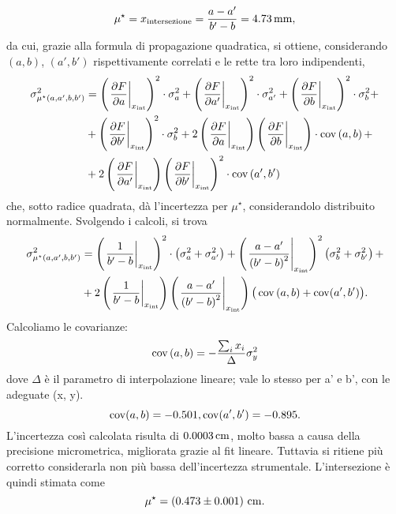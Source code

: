 \[ \mu ^{\star} = x_{\mathrm{intersezione}} = \frac{a - a'}{b' - b}  = 4.73 \,\mathrm{mm} , \]
da cui, grazie alla formula di propagazione quadratica, si ottiene, considerando $\left(a, b\right)$, $\left(a', b'\right)$ rispettivamente correlati e le rette tra loro indipendenti,
\begin{equation*}
\begin{split} %
	\sigma^2_{\mu ^{\star}\left(a, a', b, b'\right)}  &= \left(\left.\frac{\partial F}{\partial a}\right|_{x_{\mathrm{int}}}\right)^2 \cdot \sigma^2_{a} + \left(\left.\frac{\partial F}{\partial a'}\right|_{x_{\mathrm{int}}}\right)^2 \cdot \sigma^2_{a'} + \left(\left.\frac{\partial F}{\partial b}\right|_{x_{\mathrm{int}}}\right)^2 \cdot \sigma^2_{b} +\\
								&+ \left(\left.\frac{\partial F}{\partial b'}\right|_{x_{\mathrm{int}}}\right)^2 \cdot \sigma^2_{b} + 2\left(\left.\frac{\partial F}{\partial a}\right|_{x_{\mathrm{int}}}\right)\left(\left.\frac{\partial F}{\partial b}\right|_{x_{\mathrm{int}}}\right) \cdot \cov\left(a, b\right) + \\
								&+ 2\left(\left.\frac{\partial F}{\partial a'}\right|_{x_{\mathrm{int}}}\right)\left(\left.\frac{\partial F}{\partial b'}\right|_{x_{\mathrm{int}}}\right)^2 \cdot \cov \left(a', b'\right)
\end{split}
\end{equation*}
che, sotto radice quadrata, d\`a l'incertezza per $ \mu ^{\star} $, considerandolo distribuito normalmente.
Svolgendo i calcoli, si trova
\begin{equation}
\begin{split}
\sigma^2_{\mu ^{\star}\left(a, a', b, b'\right)}  &= \left(\left.\frac{1}{b'- b}\right|_{x_{\mathrm{int}}}\right)^2 \cdot \left(\sigma^2_{a} + \sigma^2_{a'}\right) + \left(\left.\frac{a - a'}{\left(b' - b\right)^2}\right|_{x_{\mathrm{int}}}\right)^2 \left(\sigma^2_{b} + \sigma^2_{b'}\right) + \\
							&+ 2 \left(\left.\frac{1}{b'- b}\right|_{x_{\mathrm{int}}}\right) \left(\left.\frac{a - a'}{\left(b' - b\right)^2}\right|_{x_{\mathrm{int}}}\right) \big(\operatorname{cov}\left(a, b\right) + \operatorname{cov}(a', b') \big).
\end{split}
\end{equation}
Calcoliamo le covarianze:
\[ \operatorname{cov}\left(a, b\right) = -\frac{\sum_{i} x_i}{\Delta}\sigma_y^2 \] 
dove $\Delta$ \`e il parametro di interpolazione lineare; vale lo stesso per a' e b', con le adeguate (x, y).
\[ \operatorname{cov}(a, b) = -0.501 , \operatorname{cov}(a', b') = -0.895 . \]
L'incertezza cos\`i calcolata risulta di $0.0003\,\mathrm{cm}$, molto bassa a causa della precisione micrometrica, migliorata grazie al fit lineare. Tuttavia si ritiene pi\`u corretto considerarla non pi\`u bassa dell'incertezza strumentale. L'intersezione \`e quindi stimata come
\[ \mu ^{\star} =  \left(0.473 \pm 0.001\right) \,\mathrm{cm}. \] %

